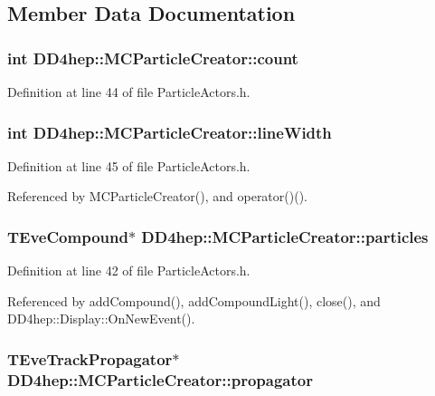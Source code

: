 \subsection{Member Data Documentation}
\hypertarget{struct_d_d4hep_1_1_m_c_particle_creator_a91d20c4304e3781732682f75271f45ef}{
\subsubsection[{count}]{\setlength{\rightskip}{0pt plus 5cm}int {\bf DD4hep::MCParticleCreator::count}}}
\label{struct_d_d4hep_1_1_m_c_particle_creator_a91d20c4304e3781732682f75271f45ef}


Definition at line 44 of file ParticleActors.h.\hypertarget{struct_d_d4hep_1_1_m_c_particle_creator_a105c9287f1f91d862a3d77d97be0557d}{
\subsubsection[{lineWidth}]{\setlength{\rightskip}{0pt plus 5cm}int {\bf DD4hep::MCParticleCreator::lineWidth}}}
\label{struct_d_d4hep_1_1_m_c_particle_creator_a105c9287f1f91d862a3d77d97be0557d}


Definition at line 45 of file ParticleActors.h.

Referenced by MCParticleCreator(), and operator()().\hypertarget{struct_d_d4hep_1_1_m_c_particle_creator_aee3566635d042c98a8f849ff6213873c}{
\subsubsection[{particles}]{\setlength{\rightskip}{0pt plus 5cm}TEveCompound$\ast$ {\bf DD4hep::MCParticleCreator::particles}}}
\label{struct_d_d4hep_1_1_m_c_particle_creator_aee3566635d042c98a8f849ff6213873c}


Definition at line 42 of file ParticleActors.h.

Referenced by addCompound(), addCompoundLight(), close(), and DD4hep::Display::OnNewEvent().\hypertarget{struct_d_d4hep_1_1_m_c_particle_creator_a536aef5f2059670db5b8dc81de6559a4}{
\subsubsection[{propagator}]{\setlength{\rightskip}{0pt plus 5cm}TEveTrackPropagator$\ast$ {\bf DD4hep::MCParticleCreator::propagator}}}
\label{struct_d_d4hep_1_1_m_c_particle_creator_a536aef5f2059670db5b8dc81de6559a4}


